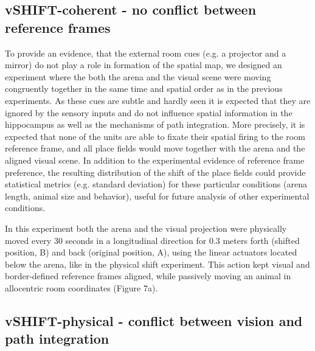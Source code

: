 \subsection{vSHIFT-coherent - no conflict between reference frames}

To provide an evidence, that the external room cues (e.g. a projector and a mirror) do not play a role in formation of the spatial map, we designed an experiment where the both the arena and the visual scene were moving congruently together in the same time and spatial order as in the previous experiments. As these cues are subtle and hardly seen it is expected that they are ignored by the sensory inputs and do not influence spatial information in the hippocampus as well as the mechanisms of path integration. More precisely, it is expected that none of the units are able to fixate their spatial firing to the room reference frame, and all place fields would move together with the arena and the aligned visual scene. In addition to the experimental evidence of reference frame preference, the resulting distribution of the shift of the place fields could provide statistical metrics (e.g. standard deviation) for these particular conditions (arena length, animal size and behavior), useful for future analysis of other experimental conditions.

In this experiment both the arena and the visual projection were physically moved every 30 seconds in a longitudinal direction for 0.3 meters forth (shifted position, B) and back (original position, A), using the linear actuators located below the arena, like in the physical shift experiment. This action kept visual and border-defined reference frames aligned, while passively moving an animal in allocentric room coordinates (Figure 7a).


\subsection{vSHIFT-physical - conflict between vision and path integration}

